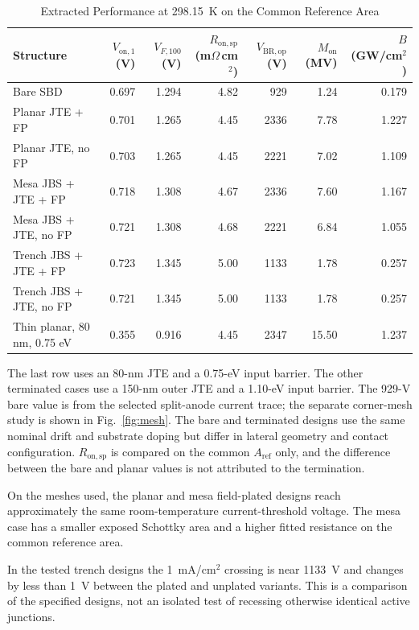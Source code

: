 \documentclass[journal,10pt]{IEEEtran}
\newcommand{\Vop}{\ensuremath{V_{\mathrm{BR,op}}}}
\newcommand{\Von}{\ensuremath{V_{\mathrm{on},1}}}
\newcommand{\Ron}{\ensuremath{R_{\mathrm{on,sp}}}}
\begin{document}
\begin{table}[!t]
\caption{Extracted Performance at 298.15~K on the Common Reference Area}
\label{tab:architectures}
\centering\footnotesize
\begin{tabular}{lrrrrrr}
\toprule
Structure & $\Von$ (V) & $V_{F,100}$ (V) & $\Ron$ (m$\Omega$\,cm$^2$) & $\Vop$ (V) & $M_{\mathrm{on}}$ (MV) & $B$ (GW/cm$^2$)\\
\midrule
Bare SBD & 0.697 & 1.294 & 4.82 & 929 & 1.24 & 0.179\\
Planar JTE + FP & 0.701 & 1.265 & 4.45 & 2336 & 7.78 & 1.227\\
Planar JTE, no FP & 0.703 & 1.265 & 4.45 & 2221 & 7.02 & 1.109\\
Mesa JBS + JTE + FP & 0.718 & 1.308 & 4.67 & 2336 & 7.60 & 1.167\\
Mesa JBS + JTE, no FP & 0.721 & 1.308 & 4.68 & 2221 & 6.84 & 1.055\\
Trench JBS + JTE + FP & 0.723 & 1.345 & 5.00 & 1133 & 1.78 & 0.257\\
Trench JBS + JTE, no FP & 0.721 & 1.345 & 5.00 & 1133 & 1.78 & 0.257\\
Thin planar, 80 nm, 0.75 eV & 0.355 & 0.916 & 4.45 & 2347 & 15.50 & 1.237\\
\bottomrule
\end{tabular}
\par\smallskip\begin{minipage}{0.96\textwidth}\footnotesize
The last row uses an 80-nm JTE and a 0.75-eV input barrier. The other terminated cases use a 150-nm outer JTE and a 1.10-eV input barrier. The 929-V bare value is from the selected split-anode current trace; the separate corner-mesh study is shown in Fig.~\ref{fig:mesh}. The bare and terminated designs use the same nominal drift and substrate doping but differ in lateral geometry and contact configuration. $R_{\mathrm{on,sp}}$ is compared on the common $A_{\mathrm{ref}}$ only, and the difference between the bare and planar values is not attributed to the termination.
\end{minipage}
\end{table}

On the meshes used, the planar and mesa field-plated designs reach approximately the same room-temperature current-threshold voltage. The mesa case has a smaller exposed Schottky area and a higher fitted resistance on the common reference area.

In the tested trench designs the 1~mA/cm$^2$ crossing is near 1133~V and changes by less than 1~V between the plated and unplated variants. This is a comparison of the specified designs, not an isolated test of recessing otherwise identical active junctions.
\end{document}
